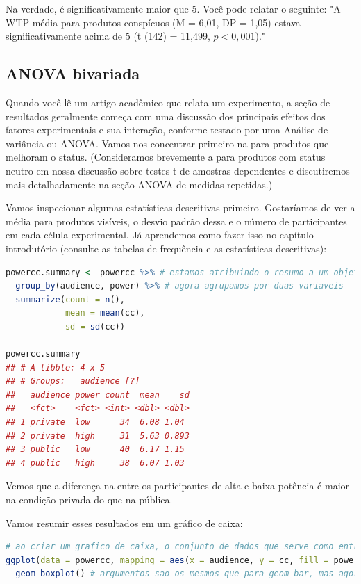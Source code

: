 \documentclass{article}
\begin{document}
Na verdade, é significativamente maior que 5. Você pode relatar o seguinte: "A WTP média para produtos conspícuos (M = 6,01, DP = 1,05) estava significativamente acima de 5 (t (142) = 11,499, $p <0,001$)."

\subsection{ANOVA bivariada}

Quando você lê um artigo acadêmico que relata um experimento, a seção de resultados geralmente começa com uma discussão dos principais efeitos dos fatores experimentais e sua interação, conforme testado por uma Análise de variância ou ANOVA. Vamos nos concentrar primeiro na  para produtos que melhoram o status. (Consideramos brevemente a  para produtos com status neutro em nossa discussão sobre testes t de amostras dependentes e discutiremos mais detalhadamente na seção ANOVA de medidas repetidas.)

Vamos inspecionar algumas estatísticas descritivas primeiro. Gostaríamos de ver a  média para produtos visíveis, o desvio padrão dessa  e o número de participantes em cada célula experimental. Já aprendemos como fazer isso no capítulo introdutório (consulte as tabelas de frequência e as estatísticas descritivas):

\begin{lstlisting}[language=R]
powercc.summary <- powercc %>% # estamos atribuindo o resumo a um objeto, porque precisaremos desse resumo para fazer um grafico de barras
  group_by(audience, power) %>% # agora agrupamos por duas variaveis
  summarize(count = n(),
            mean = mean(cc),
            sd = sd(cc))

powercc.summary
## # A tibble: 4 x 5
## # Groups:   audience [?]
##   audience power count  mean    sd
##   <fct>    <fct> <int> <dbl> <dbl>
## 1 private  low      34  6.08 1.04 
## 2 private  high     31  5.63 0.893
## 3 public   low      40  6.17 1.15 
## 4 public   high     38  6.07 1.03
\end{lstlisting}

Vemos que a diferença na  entre os participantes de alta e baixa potência é maior na condição privada do que na pública.

Vamos resumir esses resultados em um gráfico de caixa:

\begin{lstlisting}[language=R]
# ao criar um grafico de caixa, o conjunto de dados que serve como entrada para o ggplot eh o conjunto de dados completo, nao o resumo com os meios
ggplot(data = powercc, mapping = aes(x = audience, y = cc, fill = power)) + 
  geom_boxplot() # argumentos sao os mesmos que para geom_bar, mas agora fornecemos a geom_boxplot
\end{lstlisting}
\end{document}
